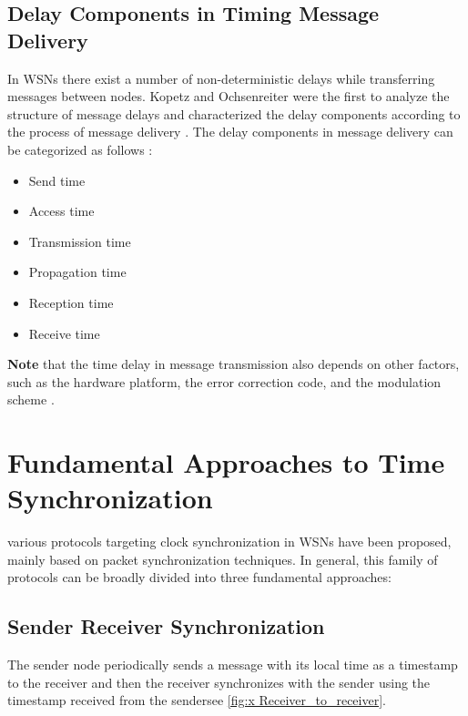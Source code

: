     \subsection{Delay Components in Timing Message Delivery}
    In WSNs there exist a number of non-deterministic delays while transferring messages between nodes. Kopetz and Ochsenreiter were the first to analyze the structure of message delays and characterized the delay components according to the process of message delivery \cite{delay}. The delay components in message delivery can be categorized as follows \cite{book}:
     \begin{itemize}
        \item Send time
        \item Access time
        \item Transmission time
        \item Propagation time
        \item Reception time
        \item Receive time
    \end{itemize}
    \textbf{Note} that the time delay in message transmission also depends on other factors, such as the hardware platform, the error correction code, and the modulation scheme .


\section{Fundamental Approaches to Time Synchronization}
various protocols targeting clock synchronization in WSNs have been proposed, mainly based on packet synchronization techniques.
In general, this family of protocols can be broadly divided into three fundamental approaches\cite{book}:

		 \subsection{Sender Receiver Synchronization}
		The sender node periodically sends a message with its local time as a timestamp to the receiver and then the receiver synchronizes with the sender using the timestamp received from the sender\cite{book}see \ref{fig:x Receiver_to_receiver}.

   
 
    
    
